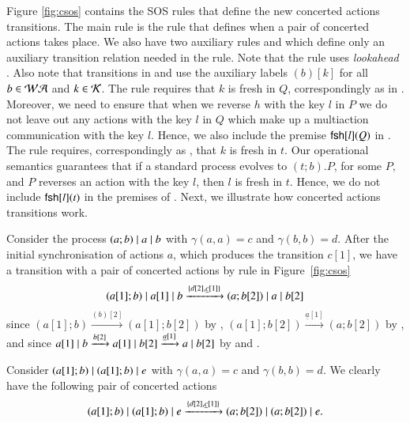 Figure \ref{fig:csos} contains the SOS rules that define the new concerted actions transitions. 
The main rule is the rule  that defines when a pair of concerted actions 
takes place.  We also have two auxiliary rules  and  which 
define only an auxiliary transition relation needed in the  rule. 
Note that the  rule uses \emph{lookahead} \cite{Uli92}.
Also note that transitions in  and  use the auxiliary labels $(b)[k]$ 
for all $b \in \mathcal{WA}$ and $k \in \mathcal{K}$. The rule  requires that $k$ is fresh in $Q$,
correspondingly as in . Moreover, we need to ensure that when we reverse $h$ with the key $l$
in $P$ we do not leave out any actions with the key $l$ in $Q$ which make up a multiaction 
communication with the key $l$. Hence, we also include the premise $\mathsf{fsh}[l](Q)$ in .
The rule  requires, correspondingly as , that $k$ is fresh in $t$.
Our operational semantics guarantees that if a standard process evolves to $(t;b).P$, for some $P$, and
$P$ reverses an action with the key $l$, then $l$ is fresh in $t$. Hence, we do not include $\mathsf{fsh}[l](t)$
in the premises of .
%
Next, we illustrate how concerted actions transitions work.

\begin{example}\label{ex:examp1}
{\rm Consider the process $(a;b) \; \vert \; a \; \vert \; b$ with $\gamma(a,a)=c$ and $\gamma(b,b)=d$. After the
initial synchronisation of actions $a$, which produces the transition $c[1]$, we have a transition
with a pair of concerted actions by rule  in Figure~\ref{fig:csos}
$$(a[1];b) \; \vert \; a[1] \; \vert \;  b \xrightarrow{\{d[2], \underline{c}[1]\}} 
  (a;b[2])\; \vert \; a \; \vert \; b[2]$$
since $(a[1];b) \xrightarrow{(b)[2]} (a[1];b[2])$ by , 
$(a[1];b[2]) \xrightarrow{\underline{a}[1]} (a;b[2])$ by , 
and since $a[1] \; \vert \; b \xrightarrow{b[2]} a[1] \; \vert \; b[2] \xrightarrow{\underline{a}[1]} a \; \vert \; b[2]$
by  and .}
\end{example}

\begin{example}\label{ex:examp2}
{\rm Consider $(a[1];b)\; \vert \; (a[1];b)\; \vert \; e$ with $\gamma(a,a)=c$ and $\gamma(b,b)=d$.
We clearly have the following pair of concerted actions
 $$(a[1];b)\; \vert \; (a[1];b)\; \vert \; e  \xrightarrow{\{d[2], \underline{c}[1]\}} 
(a;b[2])\; \vert \; (a;b[2])\; \vert \; e. $$}
\end{example}

